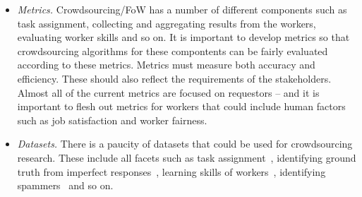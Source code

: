 \begin{itemize}
    \item \emph{Metrics.}
        Crowdsourcing/FoW has a number of different components such as task assignment,
        collecting and aggregating results from the workers, evaluating worker skills and so on.
        It is important to develop metrics so that crowdsourcing algorithms for these compontents can be fairly evaluated according to these metrics.
        Metrics must measure both accuracy and efficiency.
        These should also reflect the requirements of the stakeholders.
        Almost all of the current metrics are focused on requestors --
        and it is important to flesh out metrics for workers that could include
        human factors~\cite{roy2013crowds} such as job satisfaction and worker fairness.

    \item \emph{Datasets.}
        There is a paucity of datasets that could be used for crowdsourcing research.
        These include all facets such as
        task assignment~\cite{basu2015task,ho2012online},
        identifying ground truth from imperfect responses~\cite{zheng2017truth},
        learning skills of workers~\cite{rahman2015worker},
        identifying spammers~\cite{raykar2012eliminating} and so on.


\end{itemize}
